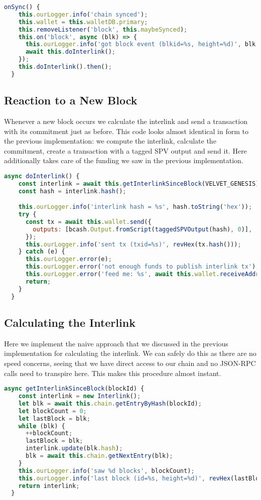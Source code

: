 \begin{lstlisting}[language=js]
  onSync() {
    this.ourLogger.info('chain synced');
    this.wallet = this.walletDB.primary;
    this.removeListener('block', this.maybeSynced);
    this.on('block', async (blk) => {
      this.ourLogger.info('got block event (blkid=%s, height=%d)', blk.rhash(), blk.height);
      await this.doInterlink();
    });
    this.doInterlink().then();
  }
\end{lstlisting}

\subsection{Reaction to a New Block}

Whenever a new block occurs we calculate the interlink and send a transaction with its commitment just as before. This code looks almost identical in form to the previous implementation: we compute the interlink, calculate the commitment, create a transaction with a tagged SPV output and send it. Here  additionally takes care of the funding we saw in the previous implementation.

\begin{lstlisting}[language=js]
  async doInterlink() {
    const interlink = await this.getInterlinkSinceBlock(VELVET_GENESIS);
    const hash = interlink.hash();

    this.ourLogger.info('interlink hash = %s', hash.toString('hex'));
    try {
      const tx = await this.wallet.send({
        outputs: [bcash.Output.fromScript(taggedSPVOutput(hash), 0)],
      });
      this.ourLogger.info('sent tx (txid=%s)', revHex(tx.hash()));
    } catch (e) {
      this.ourLogger.error(e);
      this.ourLogger.error('not enough funds to publish interlink tx');
      this.ourLogger.error('feed me: %s', await this.wallet.receiveAddress());
      return;
    }
  }
\end{lstlisting}

\subsection{Calculating the Interlink}
Here we implement the naive approach that we discussed in the previous implementation for calculating the interlink. We can safely do this as there are no speed concerns, seeing that we have direct access to our chain and no JSON-RPC calls need to transpire here. This makes this procedure almost instant.

\begin{lstlisting}[language=js]
  async getInterlinkSinceBlock(blockId) {
    const interlink = new Interlink();
    let blk = await this.chain.getEntryByHash(blockId);
    let blockCount = 0;
    let lastBlock = blk;
    while (blk) {
      ++blockCount;
      lastBlock = blk;
      interlink.update(blk.hash);
      blk = await this.chain.getNextEntry(blk);
    }
    this.ourLogger.info('saw %d blocks', blockCount);
    this.ourLogger.info('last block (id=%s, height=%d)', revHex(lastBlock.hash), lastBlock.height);
    return interlink;
  }
\end{lstlisting}

